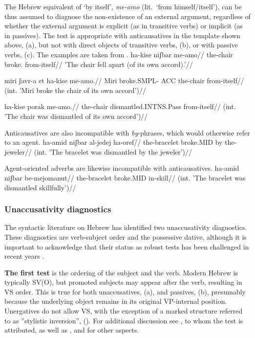 The Hebrew equivalent of `by itself', \emph{me-a{\ts}mo} (lit.~`from himself/itself'), can be thus assumed to diagnose the non-existence of an external argument, regardless of whether the external argument is explicit (as in transitive verbs) or implicit (as in passives). The test is appropriate with anticausatives in the {\tnif} template shown above, (\nextx a), but not with direct objects of transitive verbs, (\nextx b), or with passive verbs, (\nextx c). The examples are taken from \cite{ahdoutkastner18}.
\pex
	\a \begingl
	\gla ha-kise niʃbar me-a{\ts}mo//
      \glb the-chair broke. from-itself//
     \glft  'The chair fell apart (of its own accord).'//
    \endgl
    
    \a \ljudge{*} \begingl
    \gla miri ʃavr-a et ha-kise me-a{\ts}mo.//
    \glb Miri broke.SMPL- ACC the-chair from-itself//
    \glft (int. 'Miri broke the chair of its own accord')//
    \endgl
    
    \a \ljudge{*} \begingl
    \gla ha-kise porak me-a{\ts}mo.//
    \glb the-chair dismantled.INTNS.Pass from-itself//
    \glft (int. 'The chair was dismantled of its own accord')//
   \endgl
\xe
    
Anticausatives are also incompatible with \emph{by}-phrases, which would otherwise refer to an agent.
\ex \ljudge{*} \begingl
	\gla ha-{\ts}amid niʃbar al-jedej ha-{\ts}oref//
	\glb the-bracelet broke.MID by the-jeweler//
	\glft (int. 'The bracelet was dismantled by the jeweler')//
	\endgl
\xe

Agent-oriented adverbs are likewise incompatible with anticausatives.
\ex \ljudge{*} \begingl
	\gla ha-{\ts}amid niʃbar be-mejomanut//
	\glb the-bracelet broke.MID in-skill//
	\glft (int. 'The bracelet was dismantled skillfully')//
	\endgl
\xe

		\subsubsection{Unaccusativity diagnostics} \label{vz:nact:anticaus:unacc}
The syntactic literature on Hebrew has identified two unaccusativity diagnostics. These diagnostics are verb-subject order and the possessive dative, although it is important to acknowledge that their status as robust tests has been challenged in recent years \citep{gafter14li,linzen14pd,kastner17gjgl}.

\textbf{The first test} is the ordering of the subject and the verb. Modern Hebrew is typically SV(O), but promoted subjects may appear after the verb, resulting in VS order. This is true for both unaccusatives, (\nextx a), and passives, (\nextx b), presumably because the underlying object remains in its original VP-internal position. Unergatives do not allow VS, with the exception of a marked structure referred to as ''stylistic inversion'', (\anextx). For additional discussion see \cite{shlonsky87}, to whom the test is attributed, as well as \cite{shlonskydoron91}, \cite{borer95} and \cite{preminger10} for other aspects.

